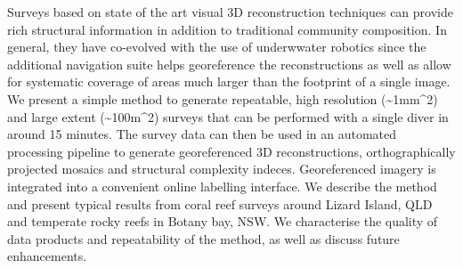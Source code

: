 Surveys based on state of the art visual 3D reconstruction techniques can provide rich structural information in addition to traditional community composition. In general, they have co-evolved with the use of underwwater robotics since the additional navigation suite helps georeference the reconstructions as well as allow for systematic coverage of areas much larger than the footprint of a single image. We present a simple method to generate repeatable, high resolution (\sim{1mm^{2}}) and large extent (\sim{100m^{2}}) surveys that can be performed with a single diver in around 15 minutes. The survey data can then be used in an automated processing pipeline to generate georeferenced 3D reconstructions, orthographically projected mosaics and structural complexity indeces. Georeferenced imagery is integrated into a convenient online labelling interface. 
We describe the method and present typical results from coral reef surveys around Lizard Island, QLD and temperate rocky reefs in Botany bay, NSW. We characterise the quality of data products and repeatability of the method, as well as discuss future enhancements.